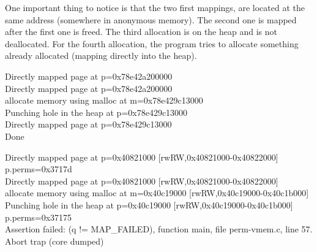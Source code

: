 \documentclass[a4paper, 11pt]{article}
\begin{document}
		One important thing to notice is that the two first mappings, are located at the same address (somewhere in anonymous memory). The second one is mapped after the first one is freed.
		The third allocation is on the heap and is not deallocated.
		For the fourth allocation, the program tries to allocate something already allocated (mapping directly into the heap).
		\begin{tcolorbox}[colback=gray!5!white, colframe=gray!75!black, title=Output on classic \Gls{risc-v} environment (No CHERI protection)]
			Directly mapped page at p=0x78e42a200000\\
			Directly mapped page at p=0x78e42a200000\\
			allocate memory using malloc at m=0x78e429c13000\\
			Punching hole in the heap at p=0x78e429c13000\\
			Directly mapped page at p=0x78e429c13000\\
			Done
		\end{tcolorbox}
		\begin{tcolorbox}[colback=gray!5!white, colframe=blue!75!black, title=Output on CHERI protected environment]
			Directly mapped page at p=0x40821000 [rwRW,0x40821000-0x40822000] p.perms=0x3717d\\
			Directly mapped page at p=0x40821000 [rwRW,0x40821000-0x40822000]\\
			allocate memory using malloc at m=0x40c19000 [rwRW,0x40c19000-0x40c1b000]\\
			Punching hole in the heap at p=0x40c19000 [rwRW,0x40c19000-0x40c1b000]\\
			p.perms=0x37175\\
			Assertion failed: (q != MAP\_FAILED), function main, file perm-vmem.c, line 57.\\
			Abort trap (core dumped)
		\end{tcolorbox}
\end{document}
